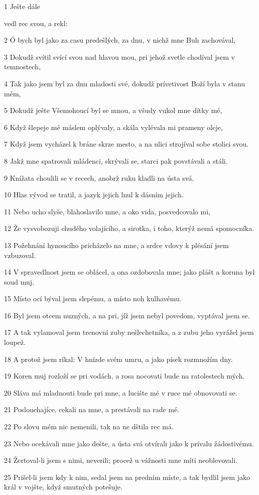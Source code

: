 \par 1 Ješte dále \par vedl rec svou, a rekl:
\par 2 Ó bych byl jako za casu predešlých, za dnu, v nichž mne Buh zachovával,
\par 3 Dokudž svítil svící svou nad hlavou mou, pri jehož svetle chodíval jsem v temnostech,
\par 4 Tak jako jsem byl za dnu mladosti své, dokudž prívetivost Boží byla v stanu mém,
\par 5 Dokudž ješte Všemohoucí byl se mnou, a všudy vukol mne dítky mé,
\par 6 Když šlepeje mé máslem oplývaly, a skála vylévala mi prameny oleje,
\par 7 Když jsem vycházel k bráne skrze mesto, a na ulici strojíval sobe stolici svou.
\par 8 Jakž mne spatrovali mládenci, skrývali se, starci pak povstávali a stáli.
\par 9 Knížata choulili se v recech, anobrž ruku kladli na ústa svá.
\par 10 Hlas vývod se tratil, a jazyk jejich lnul k dásním jejich.
\par 11 Nebo ucho slyše, blahoslavilo mne, a oko vida, posvedcovalo mi,
\par 12 Že vysvobozuji chudého volajícího, a sirotka, i toho, kterýž nemá spomocníka.
\par 13 Požehnání hynoucího pricházelo na mne, a srdce vdovy k plésání jsem vzbuzoval.
\par 14 V spravedlnost jsem se oblácel, a ona ozdobovala mne; jako plášt a koruna byl soud muj.
\par 15 Místo ocí býval jsem slepému, a místo noh kulhavému.
\par 16 Byl jsem otcem nuzných, a na pri, jíž jsem nebyl povedom, vyptával jsem se.
\par 17 A tak vylamoval jsem trenovní zuby nešlechetníka, a z zubu jeho vyrážel jsem loupež.
\par 18 A protož jsem ríkal: V hnízde svém umru, a jako písek rozmnožím dny.
\par 19 Koren muj rozloží se pri vodách, a rosa nocovati bude na ratolestech mých.
\par 20 Sláva má mladnouti bude pri mne, a lucište mé v ruce mé obnovovati se.
\par 21 Poslouchajíce, cekali na mne, a prestávali na rade mé.
\par 22 Po slovu mém nic nemenili, tak na ne dštila rec má.
\par 23 Nebo ocekávali mne jako dešte, a ústa svá otvírali jako k prívalu žádostivému.
\par 24 Žertoval-li jsem s nimi, neverili; procež u vážnosti mne míti neoblevovali.
\par 25 Prišel-li jsem kdy k nim, sedal jsem na predním míste, a tak bydlil jsem jako král v vojšte, když smutných potešuje.

